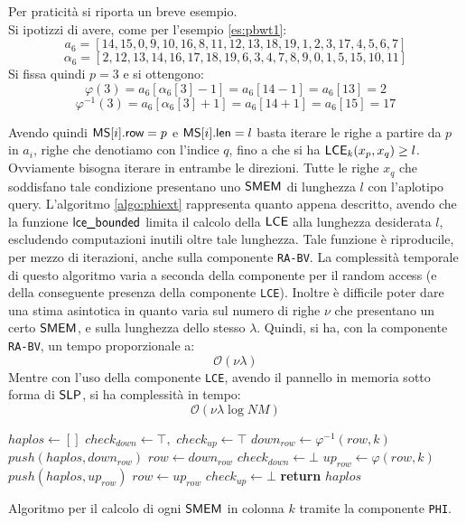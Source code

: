 \begin{esempio}
  Per praticità si riporta un breve esempio.\\
  Si ipotizzi di avere, come per l'esempio \ref{es:pbwt1}:
  \[a_6=[14,15,0,9,10,16,8,11,12,13,18,19,1,2,3,17,4,5,6,7]\]
  \[\alpha_6=[2,12,13,14,16,17,18,19,6,3,4,7,8,9,0,1,5,15,10,11]\]
  Si fissa quindi $p=3$ e si ottengono:
  \[\varphi(3)=a_6[\alpha_6[3]-1]=a_6[14-1]=a_6[13]=2\]
  \[\varphi^{-1}(3)=a_6[\alpha_6[3]+1]=a_6[14+1]=a_6[15]=17\]
\end{esempio}
Avendo quindi $\mbox{\rm {\sf MS}}[i].\mbox{\rm {\sf row}}=p$ e $\mbox{\rm {\sf MS}}[i].\mbox{\rm {\sf len}}=l$ basta iterare le righe a partire
da 
$p$ in $a_i$, righe che denotiamo con l'indice $q$, fino a che si ha 
$\mbox{\rm {\sf LCE}}_k(x_p, x_q)\geq l$. Ovviamente bisogna iterare in entrambe le
direzioni. Tutte le righe $x_q$ che soddisfano tale condizione presentano uno
$\mbox{\rm {\sf SMEM}}$ di lunghezza $l$ con 
l'aplotipo query. L'algoritmo \ref{algo:phiext} rappresenta quanto
appena descritto, avendo che la funzione $\mbox{\rm {\sf lce\_bounded}}$ limita il calcolo
della 
$\mbox{\rm {\sf LCE}}$ alla lunghezza desiderata $l$, escludendo computazioni inutili oltre tale
lunghezza. Tale funzione è riproducile, per mezzo di iterazioni, anche sulla
componente \texttt{RA-BV}. La complessità temporale di questo algoritmo
varia a seconda della componente per il random access (e della conseguente
presenza della 
componente \texttt{LCE}). Inoltre è difficile poter dare una stima asintotica in
quanto varia sul numero di righe $\nu$ che presentano un certo $\mbox{\rm {\sf SMEM}}$, e sulla
lunghezza dello stesso $\lambda$. Quindi, si ha, con la
componente \texttt{RA-BV}, un tempo proporzionale a:
\begin{equation}
  \label{eq:phiaccbv}
  \mathcal{O}(\nu\lambda)
\end{equation}
Mentre con l'uso della componente \texttt{LCE}, avendo il pannello in memoria
sotto forma di $\mbox{\rm {\sf SLP}}$, si ha complessità in tempo:
\begin{equation}
  \label{eq:phiaccbv2}
  \mathcal{O}(\nu\lambda\log NM)
\end{equation}
\begin{algorithm}
  \small
  \begin{algorithmic}[1]
    \State $haplos\gets []$
    \State $check_{down}\gets \top,\,\,check_{up}\gets \top$
    \State $down_{row}\gets \varphi^{-1}(row, k)$
    \State $push(haplos, down_{row})$
    \State $row \gets down_{row}$
    \Else
    \State $check_{down}\gets \bot$
    \EndIf
    \EndWhile
    \State $up_{row}\gets \varphi(row, k)$
    \State $push(haplos, up_{row})$
    \State $row \gets up_{row}$
    \Else
    \State $check_{up}\gets \bot$
    \EndIf
    \EndWhile
    \State \textbf{return} $haplos$
    \EndFunction
  \end{algorithmic}
  \caption{\footnotesize{Algoritmo per il calcolo di ogni $\mbox{\rm {\sf SMEM}}$ in colonna $k$
  tramite la 
  componente \texttt{PHI}.}}
  \label{algo:phiext}
\end{algorithm}
